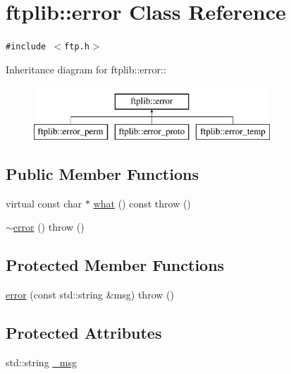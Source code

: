 \hypertarget{classftplib_1_1error}{
\section{ftplib::error Class Reference}
\label{classftplib_1_1error}
}
{\tt \#include $<$ftp.h$>$}

Inheritance diagram for ftplib::error::\begin{figure}[H]
\begin{center}
\leavevmode
\includegraphics[height=2cm]{classftplib_1_1error}
\end{center}
\end{figure}
\subsection*{Public Member Functions}
\begin{CompactItemize}
\item 
virtual const char $\ast$ \hyperlink{classftplib_1_1error_0205a5c32e446c5d7c792c708220b1a7}{what} () const   throw ()
\item 
\hyperlink{classftplib_1_1error_833d787900e419f2bd6dc28dee5d4834}{$\sim$error} ()  throw ()
\end{CompactItemize}
\subsection*{Protected Member Functions}
\begin{CompactItemize}
\item 
\hyperlink{classftplib_1_1error_27f41492c41876849d85237668cf53b6}{error} (const std::string \&msg)  throw ()
\end{CompactItemize}
\subsection*{Protected Attributes}
\begin{CompactItemize}
\item 
std::string \hyperlink{classftplib_1_1error_a7a7c753067df4b1c6ee4aefa2139f79}{\_\-msg}
\end{CompactItemize}


